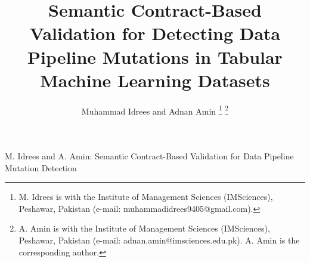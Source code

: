 \documentclass[journal]{IEEEtran}
\begin{document}
\title{Semantic Contract-Based Validation for Detecting Data 
Pipeline Mutations in Tabular\\Machine Learning Datasets}

\author{Muhammad Idrees
and Adnan Amin
\thanks{M. Idrees is with the Institute of Management Sciences (IMSciences), 
Peshawar, Pakistan (e-mail: muhammadidrees9405@gmail.com).}
\thanks{A. Amin is with the Institute of Management Sciences (IMSciences), 
Peshawar, Pakistan (e-mail: adnan.amin@imsciences.edu.pk). 
A. Amin is the corresponding author.}}

%
{M. Idrees and A. Amin: Semantic Contract-Based Validation for Data Pipeline Mutation Detection}

\maketitle
\end{document}
